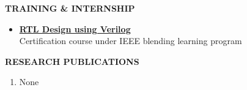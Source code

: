 \documentclass[a4paper]{article}
\begin{document}

	\begin{flushleft}
		\vspace{5mm}
		\large{\textbf{TRAINING \& INTERNSHIP }} 
		\vspace{0.5mm}
		\noindent\hrulefill
		\vspace{0.5mm}
	\end{flushleft}
	\begin{itemize}
		\item \href{https://blended-learning.ieee.org/BLPLMS/CL21/ProgramCertificate.aspx?ProductId=129&UserId=3148}{\textbf{RTL Design using Verilog}}\\
					Certification course under IEEE blending learning program              
	\end{itemize}

	\begin{flushleft}
		\vspace{5mm}
		\large{\textbf{RESEARCH PUBLICATIONS }} 
		\vspace{0.5mm}
		\noindent\hrulefill
		\vspace{0.5mm}
	\end{flushleft}
	\begin{enumerate}
		\item None              
	\end{enumerate}
\end{document}
